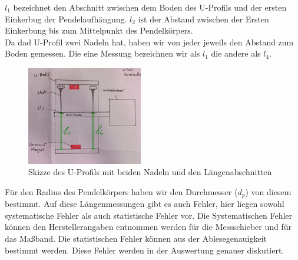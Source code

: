 \documentclass[twoside]{protokoll}
\begin{document}
$l_1$ bezeichnet den Abschnitt zwischen dem Boden des U-Profils und der ersten Einkerbug der Pendelaufhängung.
$l_2$ ist der Abstand zwischen der Ersten Einkerbung bis zum Mittelpunkt des Pendelkörpers.\\ 

Da dad U-Profil zwei Nadeln hat, haben wir von jeder jeweils den Abstand zum Boden gemessen. 
Die eine Messung bezeichnen wir als $l_1$ die andere als $l_4$.
\begin{figure}[H]
    \centering
    \includegraphics[width=0.45\textwidth]{Bilder/auflage-pende-L.pdf}
    \caption{Skizze des U-Profils mit beiden Nadeln und den Längenabschnitten}
\end{figure}

Für den Radius des Pendelkörpers haben wir den Durchmesser ($d_p$) von diesem bestimmt.
Auf diese Längenmessungen gibt es auch Fehler, hier liegen sowohl systematische Fehler als auch statistische Fehler vor.
Die Systematischen Fehler können den Herstellerangaben entnommen werden für die Messschieber und für das Maßband.
Die statistischen Fehler können aus der Ablesegenauigkeit bestimmt werden. Diese Fehler werden in der Auswertung genauer diskutiert. 
\end{document}
